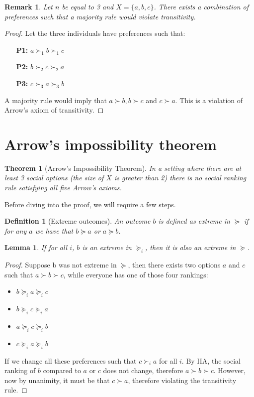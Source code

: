 \documentclass[12pt]{report}
\newtheorem{theorem}{Theorem}[chapter]
\newtheorem{definition}{Definition}[chapter]
\newtheorem{remark}{Remark}[chapter]
\newtheorem{lemma}{Lemma}[chapter]
\begin{document}
\begin{remark}
Let $n$ be equal to 3 and $X = \{a, b, c\}$. There exists a combination of preferences such that a majority rule would violate transitivity.
\end{remark}
\begin{proof}
Let the three individuals have preferences such that:\begin{itemize}
\item[\textbf{P1:}] $a\succ_1 b \succ_1 c$
\item[\textbf{P2:}] $b\succ_2 c \succ_2 a$
\item[\textbf{P3:}] $c\succ_3 a \succ_3 b$
\end{itemize}
A majority rule would imply that $a\succ b, b\succ c$ and $c\succ a$. This is a violation of Arrow's axiom of transitivity.
\end{proof}

\section{Arrow's impossibility theorem}

\begin{theorem}[Arrow's Impossibility Theorem]
In a setting where there are at least 3 social options (the size of $X$ is greater than 2) there is no social ranking rule satisfying all five Arrow's axioms.
\end{theorem}

Before diving into the proof, we will require a few steps.

\begin{definition}[Extreme outcomes]
An outcome $b$ is defined as extreme in $\succeq$ if for any $a$ we have that $b\succeq a$ or $a\succeq b$.
\end{definition} 

\begin{lemma}
If for all $i$, $b$ is an extreme in $\succeq_i$, then it is also an extreme in $\succeq$.
\end{lemma}
\begin{proof}
Suppose b was not extreme in $\succeq$, then there exists two options $a$ and $c$ such that $a\succ b \succ c$, while everyone has one of those four rankings:\begin{itemize}
\item $b\succeq_i a \succeq_i c$
\item $b\succeq_i c \succeq_i a$
\item $a\succeq_i c \succeq_i b$
\item $c\succeq_i a \succeq_i b$
\end{itemize}
If we change all these preferences such that $c\succ_i a$ for all $i$. By IIA, the social ranking of $b$ compared to $a$ or $c$ does not change, therefore $a\succ b \succ c$. However, now by unanimity, it must be that $c\succ a$, therefore violating the transitivity rule.
\end{proof}
\end{document}
